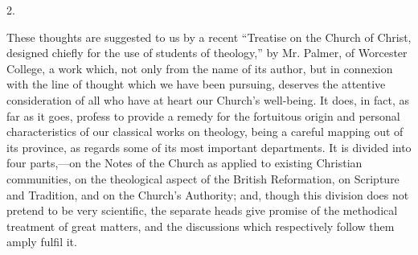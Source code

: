 2.

These thoughts are suggested to us by a recent ``Treatise
on the Church of Christ, designed chiefly for the use of students of
theology,'' by Mr. Palmer, of Worcester College, a work which, not only
from the name of its author, but in connexion with the line of
thought which we have been pursuing, deserves the attentive
consideration of all who have at heart our Church's well-being. It
does, in fact, as far as it goes, profess to provide a remedy for the
fortuitous origin and personal characteristics of our classical works
on theology, being a careful mapping out of its province, as regards
some of its most important departments. It is divided into four
parts,—on the Notes of the Church as applied to existing Christian
communities, on the theological aspect of the British Reformation, on
Scripture and Tradition, and on the Church's Authority; and, though
this division does not pretend to be very scientific, the separate
heads give promise of the methodical treatment of great matters, and
the discussions which respectively follow them amply fulfil it.

